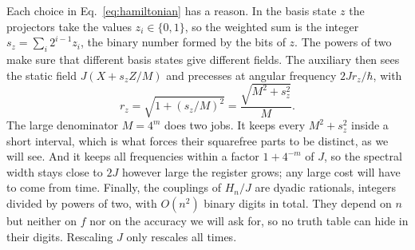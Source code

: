 \documentclass[11pt,a4paper]{article}
\begin{document}
Each choice in Eq.~\eqref{eq:hamiltonian} has a reason. In the basis state $z$ the projectors take the values $z_i\in\{0,1\}$, so the weighted sum is the integer $s_z=\sum_i2^{i-1}z_i$, the binary number formed by the bits of $z$. The powers of two make sure that different basis states give different fields. The auxiliary then sees the static field $J(X+s_zZ/M)$ and precesses at angular frequency $2Jr_z/\hbar$, with
\begin{equation*}
 r_z=\sqrt{1+(s_z/M)^2}=\frac{\sqrt{M^2+s_z^2}}{M}.
\end{equation*}
The large denominator $M=4^m$ does two jobs. It keeps every $M^2+s_z^2$ inside a short interval, which is what forces their squarefree parts to be distinct, as we will see. And it keeps all frequencies within a factor $1+4^{-m}$ of $J$, so the spectral width stays close to $2J$ however large the register grows; any large cost will have to come from time. Finally, the couplings of $H_n/J$ are dyadic rationals, integers divided by powers of two, with $O(n^2)$ binary digits in total. They depend on $n$ but neither on $f$ nor on the accuracy we will ask for, so no truth table can hide in their digits. Rescaling $J$ only rescales all times.
\end{document}
